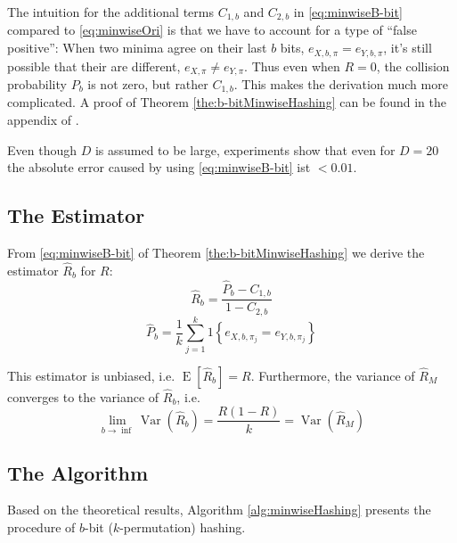 \documentclass[a4paper]{article}
\DeclareMathOperator{\Var}{Var}
\DeclareMathOperator{\E}{E}
\begin{document}
The intuition for the additional terms $C_{1,b}$ and $C_{2,b}$ in \vref{eq:minwiseB-bit} compared to \vref{eq:minwiseOri} is that we have to account for a type of ``false positive'': When two minima agree on their last $b$ bits, $e_{X,b,\pi}=e_{Y,b,\pi}$, it's still possible that their are different, $e_{X,\pi}\neq e_{Y,\pi}$. Thus even when $R=0$, the collision probability $P_b$ is not zero, but rather $C_{1,b}$. This makes the derivation much more complicated. A proof of Theorem \vref{the:b-bitMinwiseHashing} can be found in the appendix of \citep{LiK09}.

Even though $D$ is assumed to be large, experiments show that even for $D=20$ the absolute error caused by using \vref{eq:minwiseB-bit} ist $< 0.01$.

\subsection{The Estimator}

From \vref{eq:minwiseB-bit} of Theorem \vref{the:b-bitMinwiseHashing} we derive the estimator $\hat{R}_b$ for $R$:
\begin{equation}
\hat{R}_b=\frac{\hat{P}_b-C_{1,b}}{1-C_{2,b}}
\end{equation}
\begin{equation}
\hat{P}_b = \frac{1}{k}\sum_{j=1}^k 1 \left\lbrace  e_{X,b,\pi_j } = e_{Y,b,\pi_j } \right\rbrace
\end{equation}

This estimator is unbiased, i.e. $\E[\hat{R}_b]=R$. Furthermore, the variance of $\hat{R}_M$ converges to the variance of $\hat{R}_b$, i.e.
\begin{equation}
\lim_{b\rightarrow\inf}\Var\left(\hat{R}_b\right)=\frac{R(1-R)}{k}=\Var\left(\hat{R}_M\right)
\end{equation}

\subsection{The Algorithm}

Based on the theoretical results, Algorithm \vref{alg:minwiseHashing} presents the procedure of $b$-bit ($k$-permutation) hashing.
\end{document}
